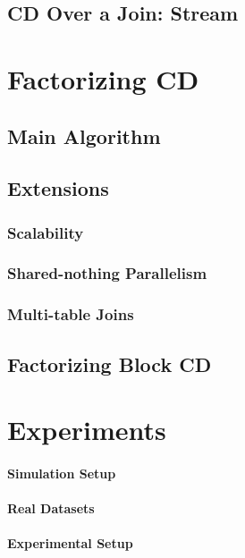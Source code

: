 \documentclass{vldb}
\begin{document}
\subsection{CD Over a Join: Stream}



\section{Factorizing CD}

\subsection{Main Algorithm}

\subsection{Extensions}

\subsubsection{Scalability}

\subsubsection{Shared-nothing Parallelism}

\subsubsection{Multi-table Joins}


\subsection{Factorizing Block CD}


\section{Experiments}

\paragraph*{Simulation Setup}

\paragraph*{Real Datasets}

\paragraph*{Experimental Setup}
\end{document}
